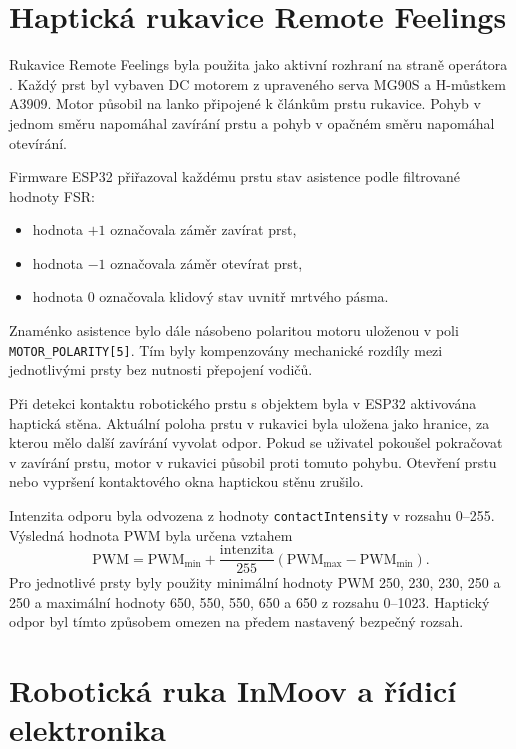 \section{Haptická rukavice Remote Feelings}
\label{sec:hapticka-rukavice}

Rukavice Remote Feelings byla použita jako aktivní rozhraní na straně operátora \cite{Nezval2011}. Každý prst byl vybaven DC motorem z upraveného serva MG90S a H-můstkem A3909. Motor působil na lanko připojené k článkům prstu rukavice. Pohyb v jednom směru napomáhal zavírání prstu a pohyb v opačném směru napomáhal otevírání.

Firmware ESP32 přiřazoval každému prstu stav asistence podle filtrované hodnoty FSR:

\begin{itemize}
    \item hodnota $+1$ označovala záměr zavírat prst,
    \item hodnota $-1$ označovala záměr otevírat prst,
    \item hodnota $0$ označovala klidový stav uvnitř mrtvého pásma.
\end{itemize}

Znaménko asistence bylo dále násobeno polaritou motoru uloženou v poli \texttt{MOTOR\_POLARITY[5]}. Tím byly kompenzovány mechanické rozdíly mezi jednotlivými prsty bez nutnosti přepojení vodičů.

Při detekci kontaktu robotického prstu s objektem byla v ESP32 aktivována haptická stěna. Aktuální poloha prstu v rukavici byla uložena jako hranice, za kterou mělo další zavírání vyvolat odpor. Pokud se uživatel pokoušel pokračovat v zavírání prstu, motor v rukavici působil proti tomuto pohybu. Otevření prstu nebo vypršení kontaktového okna haptickou stěnu zrušilo.

Intenzita odporu byla odvozena z hodnoty \texttt{contactIntensity} v rozsahu 0--255. Výsledná hodnota PWM byla určena vztahem
\begin{equation}
    \mathrm{PWM} =
    \mathrm{PWM}_{\min} +
    \frac{\mathrm{intenzita}}{255}
    \left(\mathrm{PWM}_{\max} - \mathrm{PWM}_{\min}\right).
\end{equation}
Pro jednotlivé prsty byly použity minimální hodnoty PWM 250, 230, 230, 250 a 250 a maximální hodnoty 650, 550, 550, 650 a 650 z rozsahu 0--1023. Haptický odpor byl tímto způsobem omezen na předem nastavený bezpečný rozsah.

\section{Robotická ruka InMoov a řídicí elektronika}
\label{sec:roboticka-ruka}

